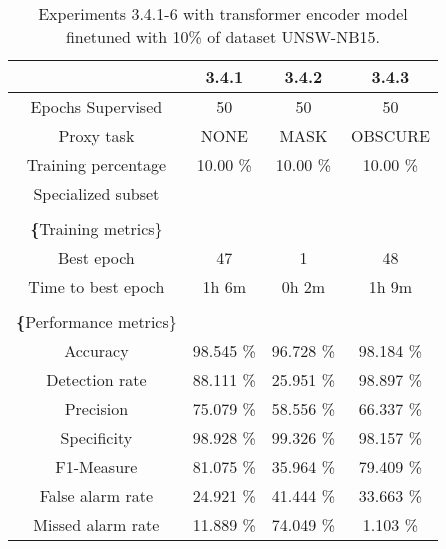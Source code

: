 \begin{table}[htb]
    \centering
    \begin{tabular}{@{}cccc@{}}
        \toprule
         & 3.4.1 & 3.4.2 & 3.4.3 \\
        \midrule
        Epochs Supervised &  50 &  50 &  50 \\
        Proxy task &  NONE &  MASK &  OBSCURE \\
        Training percentage &  10.00 \% &  10.00 \% &  10.00 \% \\
        Specialized subset &   &   &   \\
         \\
        \textbf\{Training metrics\} &  &  &  \\
        Best epoch &  47 &  1 &  48 \\
        Time to best epoch &  1h 6m &  0h 2m &  1h 9m \\
         \\
        \textbf\{Performance metrics\} &  &  &  \\
        Accuracy &  98.545 \% &  96.728 \% &  98.184 \% \\
        Detection rate &  88.111 \% &  25.951 \% &  98.897 \% \\
        Precision &  75.079 \% &  58.556 \% &  66.337 \% \\
        Specificity &  98.928 \% &  99.326 \% &  98.157 \% \\
        F1-Measure &  81.075 \% &  35.964 \% &  79.409 \% \\
        False alarm rate &  24.921 \% &  41.444 \% &  33.663 \% \\
        Missed alarm rate &  11.889 \% &  74.049 \% &  1.103 \% \\
        \bottomrule
    \end{tabular}
    \caption{Experiments 3.4.1-6 with transformer encoder model finetuned with 10\% of dataset UNSW-NB15.}
    \label{table:results:lstm:stats_flows15_10}
\end{table}